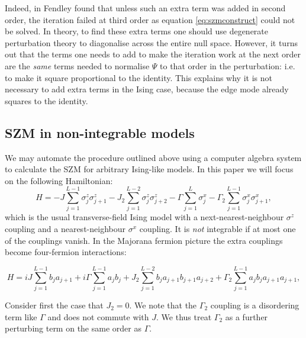 \documentclass [a4paper, 11pt]{article}
\begin{document}
Indeed, in \cite{XYZ} Fendley found that unless such an extra term was added in second order, the iteration failed at third order as equation \eqref{eq:szmconstruct} could not be solved. In theory, to find these extra terms one should use degenerate perturbation theory to diagonalise across the entire null space. However, it turns out that the terms one needs to add to make the iteration work at the next order are the \emph{same} terms needed to normalise $\Psi$ to that order in the perturbation: i.e. to make it square proportional to the identity. This explains why it is not necessary to add extra terms in the Ising case, because the edge mode already squares to the identity.

\subsection{SZM in non-integrable models}
\label{sec:pseudoszm}
We may automate the procedure outlined above using a computer algebra system to calculate the SZM for arbitrary Ising-like models. In this paper we will focus on the following Hamiltonian:
\begin{equation}
  \label{eq:hamiltonian}
  H = -J\sum_{j=1}^{L-1} \sigma^z_j  \sigma^z_{j+1} -J_2\sum_{j=1}^{L-2} \sigma^z_j  \sigma^z_{j+2} - \Gamma \sum_{j=1}^L \sigma^x_j -  \Gamma_2 \sum_{j=1}^{L-1} \sigma^x_j \sigma^x_{j+1},
\end{equation}
which is the usual transverse-field Ising model with a next-nearest-neighbour $\sigma^z$ coupling and a nearest-neighbour $\sigma^x$ coupling. It is \emph{not} integrable if at most one of the couplings vanish. In the Majorana fermion picture the extra couplings become four-fermion interactions:

\begin{equation}
H = i J\sum_{j=1}^{L-1} b_j  a_{j+1} + i \Gamma \sum_{j=1}^{L-1} a_j b_j + J_2\sum_{j=1}^{L-2} b_j a_{j+1} b_{j+1} a_{j+2} + \Gamma_2\sum_{j=1}^{L-1} a_j b_{j} a_{j+1} a_{j+1},
\end{equation}
 

Consider first the case that $J_2 =0$. We note that the $\Gamma_2$ coupling is a disordering term like $\Gamma$ and does not commute with $J$. We thus treat $\Gamma_2$ as a further perturbing term on the same order as $\Gamma$.
\end{document}
